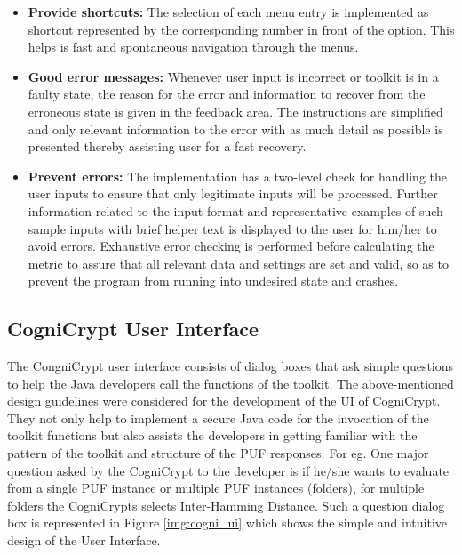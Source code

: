 \begin{itemize}
	\item \textbf{Provide shortcuts:} The selection of each menu entry is implemented as shortcut represented by the corresponding number in front of the option. This helps is fast and spontaneous navigation through the menus.
	\item \textbf{Good error messages:} Whenever user input is incorrect or toolkit is in a faulty state, the reason for the error and information to recover from the erroneous state is given in the feedback area. The instructions are simplified and only relevant information to the error with as much detail as possible is presented thereby assisting user for a fast recovery.
	\item \textbf{Prevent errors:} The implementation has a two-level check for handling the user inputs to ensure that only legitimate inputs will be processed. Further information related to the input format and representative examples of such sample inputs with brief helper text is displayed to the user for him/her to avoid errors. Exhaustive error checking is performed before calculating the metric to assure that all relevant data and settings are set and valid, so as to prevent
		the program from running into undesired state and crashes.
\end{itemize}

\subsection{CogniCrypt User Interface}
The CongniCrypt user interface consists of dialog boxes that ask simple questions to help the Java developers call the functions of the toolkit.
The above-mentioned design guidelines were considered for the development of the UI of CogniCrypt. They not only help to implement a secure Java code for the invocation of the toolkit functions but also assists the developers in getting familiar with the pattern of the toolkit and structure of the PUF responses. For eg. One major question asked by the CogniCrypt to the developer is if he/she wants to evaluate from a single PUF instance or multiple PUF instances (folders), for multiple
folders the CogniCrypts selects Inter-Hamming Distance. Such a question dialog box is represented in Figure \ref{img:cogni_ui} which shows the simple and intuitive design of the User Interface.\\

